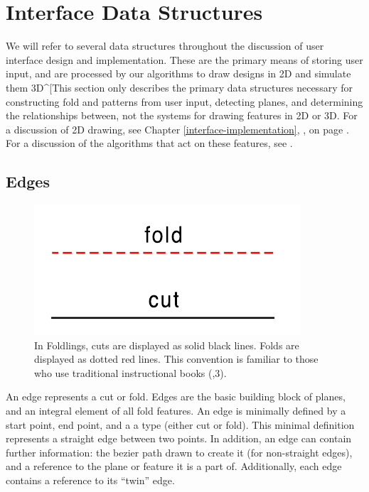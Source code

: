 \section{Interface Data Structures}\label{interface-data-structures}

We will refer to several data structures throughout the discussion of
user interface design and implementation. These are the primary means of
storing user input, and are processed by our algorithms to draw designs
in 2D and simulate them 3D\^{}{[}This section only describes the primary
data structures necessary for constructing fold and patterns from user
input, detecting planes, and determining the relationships between, not
the systems for drawing features in 2D or 3D. For a discussion of 2D
drawing, see Chapter \ref{interface-implementation},
, on page
\pageref{interface-implementation}. For a discussion of the algorithms
that act on these features, see \citet{mallen}.

\subsection{Edges}\label{edges}

\begin{figure}[htbp]
\centering
\includegraphics{figures/33_UI_Interface_Data_Structures/foldvsedge.pdf}
\caption{In Foldlings, cuts are displayed as solid black lines. Folds
are displayed as dotted red lines. This convention is familiar to those
who use traditional instructional books
(\citet{berenson1972kirigami},3).}
\end{figure}

An edge represents a cut or fold. Edges are the basic building block of
planes, and an integral element of all fold features. An edge is
minimally defined by a start point, end point, and a a type (either cut
or fold). This minimal definition represents a straight edge between two
points. In addition, an edge can contain further information: the bezier
path drawn to create it (for non-straight edges), and a reference to the
plane or feature it is a part of. Additionally, each edge contains a
reference to its ``twin'' edge.

